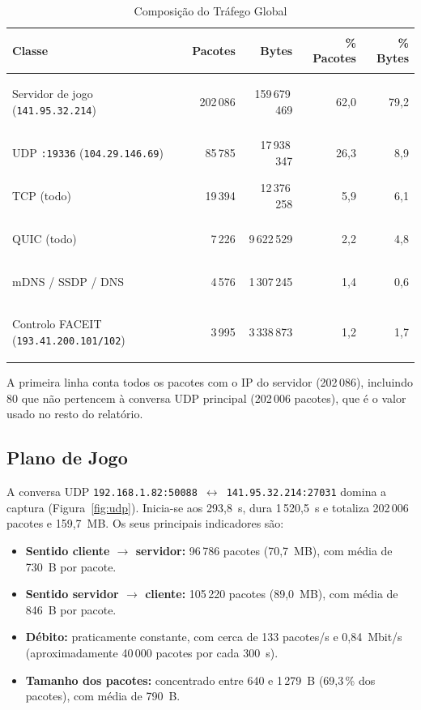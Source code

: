 \documentclass[11pt,a4paper]{article}
\begin{document}
\begin{table}[htbp]
\centering
\caption{Composição do Tráfego Global}\label{tab:comp}
\begin{tabularx}{\linewidth}{@{}>{\bfseries\raggedright\arraybackslash}Xrrrr@{}}
\toprule
\textbf{Classe} & \textbf{Pacotes} & \textbf{Bytes} & \textbf{\% Pacotes} & \textbf{\% Bytes}\\
\midrule
Servidor de jogo (\texttt{141.95.32.214})     & 202\,086 & 159\,679\,469 & 62,0 & 79,2\\
UDP \texttt{:19336} (\texttt{104.29.146.69})  &  85\,785 &  17\,938\,347 & 26,3 &  8,9\\
TCP (todo)                                     &  19\,394 &  12\,376\,258 &  5,9 &  6,1\\
QUIC (todo)                                    &   7\,226 &   9\,622\,529 &  2,2 &  4,8\\
mDNS / SSDP / DNS                              &   4\,576 &   1\,307\,245 &  1,4 &  0,6\\
Controlo FACEIT (\texttt{193.41.200.101/102})  &   3\,995 &   3\,338\,873 &  1,2 &  1,7\\
\bottomrule
\end{tabularx}
\end{table}

A primeira linha conta todos os pacotes com o IP do servidor (202\,086), incluindo 80 que não pertencem à conversa UDP principal
(202\,006 pacotes), que é o valor usado no resto do relatório.

\subsection{Plano de Jogo}
A conversa UDP \texttt{192.168.1.82:50088}~$\leftrightarrow$~\texttt{141.95.32.214:27031} domina a captura
(Figura~\ref{fig:udp}). Inicia-se aos 293,8~s, dura 1\,520,5~s e totaliza 202\,006 pacotes e 159,7~MB. Os seus principais
indicadores são:
\begin{itemize}
  \item \textbf{Sentido cliente $\rightarrow$ servidor:} 96\,786 pacotes (70,7~MB), com média de 730~B por pacote.
  \item \textbf{Sentido servidor $\rightarrow$ cliente:} 105\,220 pacotes (89,0~MB), com média de 846~B por pacote.
  \item \textbf{Débito:} praticamente constante, com cerca de 133 pacotes/s e 0,84~Mbit/s (aproximadamente 40\,000 pacotes por
        cada 300~s).
  \item \textbf{Tamanho dos pacotes:} concentrado entre 640 e 1\,279~B (69,3\,\% dos pacotes), com média de 790~B.
\end{itemize}
\end{document}

